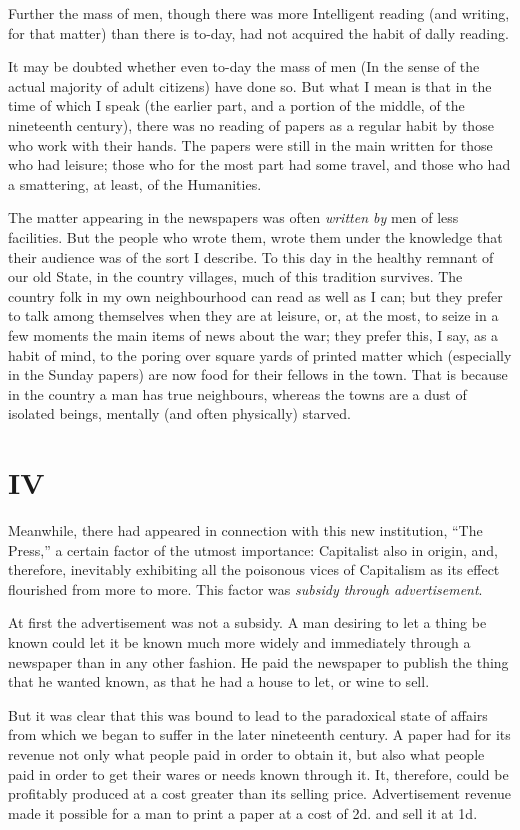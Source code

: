 \documentclass{book}
\begin{document}
Further the mass of men, though there was more Intelligent reading (and writing, for that matter) than there is to-day, had not acquired the habit of dally reading.

It may be doubted whether even to-day the mass of men (In the sense of the actual majority of adult citizens) have done so. But what I mean is that in the time of which I speak (the earlier part, and a portion of the middle, of the nineteenth century), there was no reading of papers as a regular habit by those who work with their hands. The papers were still in the main written for those who had leisure; those who for the most part had some travel, and those who had a smattering, at least, of the Humanities.

The matter appearing in the newspapers was often \emph{written by} men of less facilities. But the people who wrote them, wrote them under the knowledge that their audience was of the sort I describe. To this day in the healthy remnant of our old State, in the country villages, much of this tradition survives. The country folk in my own neighbourhood can read as well as I can; but they prefer to talk among themselves when they are at leisure, or, at the most, to seize in a few moments the main items of news about the war; they prefer this, I say, as a habit of mind, to the poring over square yards of printed matter which (especially in the Sunday papers) are now food for their fellows in the town. That is because in the country a man has true neighbours, whereas the towns are a dust of isolated beings, mentally (and often physically) starved.

\chapter*{IV}
\label{chapter-5}
Meanwhile, there had appeared in connection with this new institution, “The Press,” a certain factor of the utmost importance: Capitalist also in origin, and, therefore, inevitably exhibiting all the poisonous vices of Capitalism as its effect flourished from more to more. This factor was \emph{subsidy through advertisement}.

At first the advertisement was not a subsidy. A man desiring to let a thing be known could let it be known much more widely and immediately through a newspaper than in any other fashion. He paid the newspaper to publish the thing that he wanted known, as that he had a house to let, or wine to sell.

But it was clear that this was bound to lead to the paradoxical state of affairs from which we began to suffer in the later nineteenth century. A paper had for its revenue not only what people paid in order to obtain it, but also what people paid in order to get their wares or needs known through it. It, therefore, could be profitably produced at a cost greater than its selling price. Advertisement revenue made it possible for a man to print a paper at a cost of 2d. and sell it at 1d.
\end{document}
